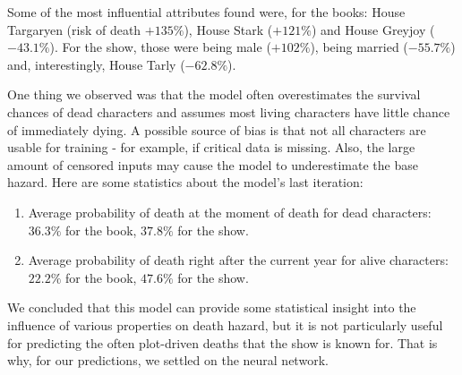 \documentclass{bioinfo}
\begin{document}
Some of the most influential attributes found were, for the books: House Targaryen (risk of death $+135\%$), House Stark ($+121\%$) and House Greyjoy ($-43.1\%$). For the show, those were being male ($+102\%$), being married ($-55.7\%$) and, interestingly, House Tarly ($-62.8\%$).

One thing we observed was that the model often overestimates the survival chances of dead characters and assumes most living characters have little chance of immediately dying. A possible source of bias is that not all characters are usable for training - for example, if critical data is missing. Also, the large amount of censored inputs may cause the model to underestimate the base hazard. Here are some statistics about the model's last iteration:
\begin{enumerate}
    \item Average probability of death at the moment of death for dead characters: $36.3\%$ for the book, $37.8\%$ for the show.
    \item Average probability of death right after the current year for alive characters: $22.2\%$ for the book, $47.6\%$ for the show.
\end{enumerate}

We concluded that this model can provide some statistical insight into the influence of various properties on death hazard, but it is not particularly useful for predicting the often plot-driven deaths that the show is known for. That is why, for our predictions, we settled on the neural network.




%
%
%
%
%
%
%
%
%
\end{document}
